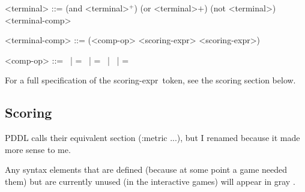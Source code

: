 \documentclass{article}
\begin{document}
\begin{grammar}
<terminal> ::= (and <terminal>$^+$) \alt
        (or <terminal>$+$) \alt
        (not <terminal>) \alt
        <terminal-comp>

<terminal-comp> ::= (<comp-op> <scoring-expr> <scoring-expr>) 
    
    <comp-op> ::=  \textlangle \ | \textlangle = \ | = \ | \textrangle \ | \textrangle =



\end{grammar}
For a full specification of the \textlangle scoring-expr\textrangle\ token, see the scoring section below.
        


\subsection{Scoring}
PDDL calls their equivalent section (:metric ...), but I renamed because it made more sense to me. 

        Any syntax elements that are defined (because at some point a game needed them) but are currently unused (in the interactive games) will appear in { \color{gray} gray }.
        
\end{document}
